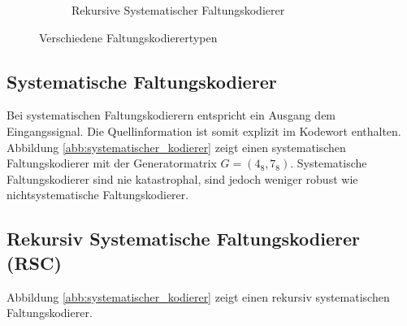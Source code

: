 \begin{figure}[!t]
\begin{subfigure}{0.45\textwidth}
{
}
\caption{Rekursive Systematischer Faltungskodierer}
\label{abb:rsc_kodierer}
\end{subfigure}
\caption{Verschiedene Faltungskodierertypen}
\label{abb:faltungskodierer_typen}
\end{figure}

\subsection{Systematische Faltungskodierer}
\label{kapitel:grundlagen_systematische_kodierer}
Bei systematischen Faltungskodierern entspricht ein Ausgang dem Eingangssignal. Die Quellinformation ist somit explizit im Kodewort enthalten. Abbildung \ref{abb:systematischer_kodierer} zeigt einen systematischen Faltungskodierer mit der Generatormatrix $G=(4_{8},7_{8})$. Systematische Faltungskodierer sind nie katastrophal, sind jedoch weniger robust wie nichtsystematische Faltungskodierer. \cite[S. 217]{schonfeld2012informations}

\subsection{Rekursiv Systematische Faltungskodierer (RSC)}
\label{kapitel:grundlagen_rsc}
Abbildung \ref{abb:systematischer_kodierer} zeigt einen rekursiv systematischen Faltungskodierer.